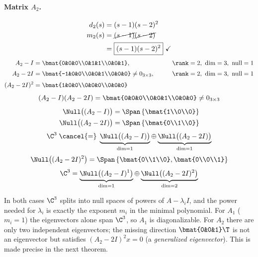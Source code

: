 \begin{example}
\paragraph{Matrix $A_2$.}
\begin{align*}
d_2(s)&=(s-1)(s-2)^2\\
m_2(s)&=\cancel{(s-1)}\cancel{(s-2)}\\
&=\boxed{(s-1)(s-2)^2}\ \checkmark
\end{align*}
\begin{alignat*}{2}
A_2-I&=\bmat{0&0&0\\0&1&1\\0&0&1}, &\qquad&\rank=2,\ \dim=3,\ \text{null}=1\\[2pt]
A_2-2I&=\bmat{-1&0&0\\0&0&1\\0&0&0}\neq 0_{3\times3}, &&\rank=2,\ \dim=3,\ \text{null}=1\\[2pt]
(A_2-2I)^2&=\bmat{1&0&0\\0&0&0\\0&0&0}
\end{alignat*}
\[ (A_2-I)(A_2-2I)=\bmat{0&0&0\\0&0&1\\0&0&0}\neq0_{3\times3} \]
\begin{align*}
\Null\big((A_2-I)\big)&=\Span\left\{\bmat{1\\0\\0}\right\}\\
\Null\big((A_2-2I)\big)&=\Span\left\{\bmat{0\\1\\0}\right\}
\end{align*}
\[
\C^3\;\cancel{=}\;\underbrace{\Null\big((A_2-I)\big)}_{\dim=1}\oplus\underbrace{\Null\big((A_2-2I)\big)}_{\dim=1}
\]
\[
\Null\big((A_2-2I)^2\big)=\Span\left\{\bmat{0\\1\\0},\bmat{0\\0\\1}\right\}
\]
\[
\C^3=\underbrace{\Null\big((A_2-I)^{1}\big)}_{\dim=1}\oplus\underbrace{\Null\big((A_2-2I)^{2}\big)}_{\dim=2}
\]
\begin{insight}
In both cases $\C^3$ splits into null spaces of powers of $A-\lambda_iI$, and the power needed for $\lambda_i$ is exactly the exponent $m_i$ in the minimal polynomial. For $A_1$ ($m_i=1$) the eigenvectors alone span $\C^3$, so $A_1$ is diagonalizable. For $A_2$ there are only two independent eigenvectors; the missing direction $\bmat{0&0&1}\T$ is not an eigenvector but satisfies $(A_2-2I)^2x=0$ (a \emph{generalized eigenvector}). This is made precise in the next theorem.
\end{insight}
\end{example}

